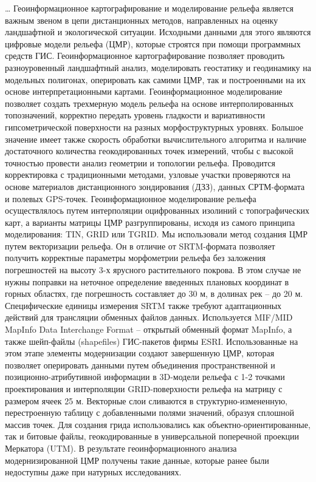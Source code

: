 \documentclass[runningheads]{AIIT}
\begin{document}
…
Геоинформационное картографирование и моделирование рельефа является важным звеном в цепи дистанционных методов, направленных на оценку ландшафтной и экологической ситуации. Исходными данными для этого являются цифровые модели рельефа (ЦМР), которые строятся при помощи программных средств ГИС. Геоинформационное картографирование позволяет проводить разноуровенный ландшафтный анализ, моделировать геостатику и геодинамику на модельных полигонах, оперировать как самими ЦМР, так и построенными на их основе интерпретационными картами.
Геоинформационное моделирование позволяет создать трехмерную модель рельефа на основе интерполированных топозначений, корректно передать уровень гладкости и вариативности гипсометрической поверхности на разных морфоструктурных уровнях. Большое значение имеет также скорость обработки вычислительного алгоритма и наличие достаточного количества геокодированных точек измерений, чтобы с высокой точностью провести анализ геометрии и топологии рельефа. Проводится корректировка с традиционными методами, узловые участки проверяются на основе материалов дистанционного зондирования (ДЗЗ), данных СРТМ-формата и полевых GPS-точек.
Геоинформационное моделирование рельефа осуществлялось путем интерполяции оцифрованных изолиний с топографических карт, а варианты матрицы ЦМР разгруппированы, исходя из самого принципа моделирования: TIN, GRID или TGRID. Мы использовали метод создания ЦМР путем векторизации рельефа. Он в отличие от SRTM-формата позволяет получить корректные параметры морфометрии рельефа без заложения погрешностей на высоту 3-х ярусного растительного покрова. В этом случае не нужны поправки на неточное определение введенных плановых координат в горных областях, где погрешность составляет до 30 м, в долинах рек – до 20 м. Специфические единицы измерения SRTM также требуют адаптационных действий для трансляции обменных файлов данных. Используется MIF/MID MapInfo Data Interchange Format – открытый обменный формат MapInfo, а также шейп-файлы (shapefiles) ГИС-пакетов фирмы ESRI.
Использованные на этом этапе элементы модернизации создают завершенную ЦМР, которая позволяет оперировать данными путем объединения пространственной и позиционно-атрибутивной информации в 3D-модели рельефа с 1-2 точками проектирования и интерполяции GRID-поверхности рельефа на матрицу с размером ячеек 25 м. Векторные слои сливаются в структурно-измененную, перестроенную таблицу с добавленными полями значений, образуя сплошной массив точек. Для создания грида использовались как объектно-ориентированные, так и битовые файлы, геокодированные в универсальной поперечной проекции Меркатора (UTM). В результате геоинформационного анализа модернизированной ЦМР получены такие данные, которые ранее были недоступны даже при натурных исследованиях.
\end{document}

